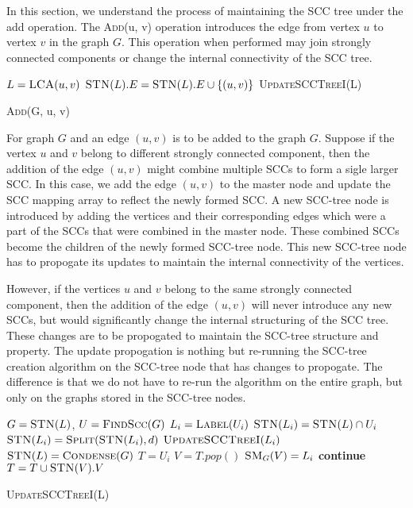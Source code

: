 In this section, we understand the process of maintaining the SCC tree under the add operation. The \textsc{Add}(u, v) operation introduces the edge from vertex $u$ to vertex $v$ in the graph $G$.
This operation when performed may join strongly connected components or change the internal connectivity of the SCC tree.

\begin{algorithm}[H]
    \SetAlgoLined
    $L = \text{\textsc{LCA}}(u, v)$\;
    $\text{\textsc{STN}}(L).E = \text{\textsc{STN}}(L).E \cup \{(u, v)\}$\;
    \textsc{UpdateSCCTreeI}(L)\;
    \caption{\textsc{Add}(G, u, v)}
\end{algorithm}

For graph $G$ and an edge $(u, v)$ is to be added to the graph $G$. Suppose if the vertex $u$ and $v$ belong to different strongly connected component, 
then the addition of the edge $(u, v)$ might combine multiple SCCs to form a sigle larger SCC. In this case, we add the edge $(u, v)$ to the master node
and update the SCC mapping array to reflect the newly formed SCC. A new SCC-tree node is introduced by adding the vertices and their corresponding edges which were a part of the SCCs that were combined in the master node.
These combined SCCs become the children of the newly formed SCC-tree node. This new SCC-tree node has to propogate its updates to maintain the internal connectivity of the vertices.

However, if the vertices $u$ and $v$ belong to the same strongly connected component, then the addition of the edge $(u, v)$ will never introduce any new SCCs, but would significantly change the internal structuring of the SCC tree.
These changes are to be propogated to maintain the SCC-tree structure and property.
The update propogation is nothing but re-running the SCC-tree creation algorithm on the SCC-tree node that has changes to propogate. The difference is that we do not have to re-run the algorithm on the entire graph, but only on the graphs stored in the SCC-tree nodes.

\begin{algorithm}[H]
    \SetAlgoLined
    $G = \textsc{STN}(L)$, $U = \text{\textsc{FindScc}}(G)$\;
     {
        $L_i = \textsc{Label}(U_i)$\;
        $\textsc{STN}(L_i) = \textsc{STN}(L) \cap U_i$\;
        $\textsc{STN}(L_i) = \textsc{Split}(\textsc{STN}(L_i), d)$\;
        $\textsc{UpdateSCCTreeI}(L_i)$\;
    }
    $\textsc{STN}(L) = \textsc{Condense}(G)$\;
     {
        $T = U_i$\;
         {
            $V = T.pop()$\;
             {
                $\textsc{SM}_G(V) = L_i$\;
                \textbf{continue}\;
            }
            $T = T \cup \textsc{STN}(V).V$\;
        }
    }


    \caption{\textsc{UpdateSCCTreeI}(L)}
\end{algorithm}

